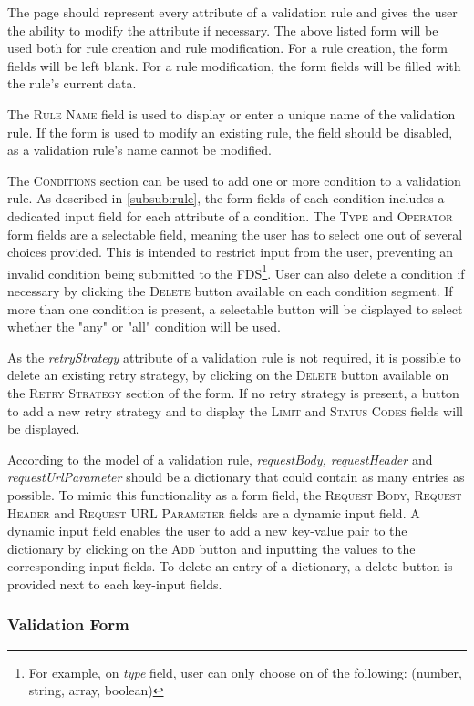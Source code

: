 The page should represent every attribute of a validation rule and gives the user the ability to modify the attribute if necessary. The above listed form will be used both for rule creation and rule modification. For a rule creation, the form fields will be left blank. For a rule modification, the form fields will be filled with the rule's current data. 

The \textsc{Rule Name} field is used to display or enter a unique name of the validation rule. If the form is used to modify an existing rule, the field should be disabled, as a validation rule's name cannot be modified. 

The \textsc{Conditions} section can be used to add one or more condition to a validation rule. As described in \autoref{subsub:rule}, the form fields of each condition includes a dedicated input field for each attribute of a condition. The \textsc{Type} and \textsc{Operator} form fields are a selectable field, meaning the user has to select one out of several choices provided. This is intended to restrict input from the user, preventing an invalid condition being submitted to the FDS\footnote{For example, on \emph{type} field, user can only choose on of the following: (number, string, array, boolean)}. User can also delete a condition if necessary by clicking the \textsc{Delete} button available on each condition segment. If more than one condition is present, a selectable button will be displayed to select whether the "any" or "all" condition will be used. 

As the \emph{retryStrategy} attribute of a validation rule is not required, it is possible to delete an existing retry strategy, by clicking on the \textsc{Delete} button available on the \textsc{Retry Strategy} section of the form. If no retry strategy is present, a button to add a new retry strategy and to display the \textsc{Limit} and \textsc{Status Codes} fields will be displayed.

According to the model of a validation rule, \emph{requestBody, requestHeader} and \emph{requestUrlParameter} should be a dictionary that could contain as many entries as possible. To mimic this functionality as a form field, the \textsc{Request Body, Request Header} and \textsc{Request URL Parameter} fields are a dynamic input field. A dynamic input field enables the user to add a new key-value pair to the dictionary by clicking on the \textsc{Add} button and inputting the values to the corresponding input fields. To delete an entry of a dictionary, a delete button is provided next to each key-input fields. 


\subsubsection{Validation Form}

